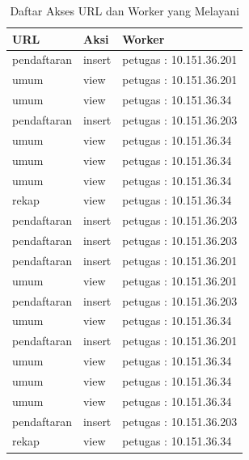 \documentclass{ta-its}
\begin{document}
					\begin{longtable}{|p{}|p{}|p{}|} %
						
						\caption{Daftar Akses URL dan Worker yang Melayani} \label{tabelBagiBeban} \\
						\hline
						\textbf{URL} & \textbf{Aksi} & \textbf{Worker} \\ \hline
						
						\endhead
						\endfoot
						\endlastfoot
						
						pendaftaran & insert & petugas :  10.151.36.201 \\ \hline
						umum & view	& petugas :  10.151.36.201 \\ \hline
						umum & view & petugas :  10.151.36.34 \\ \hline
						pendaftaran & insert & petugas :  10.151.36.203 \\ \hline
						umum & view & petugas :  10.151.36.34 \\ \hline
						umum & view & petugas :  10.151.36.34 \\ \hline
						umum & view & petugas :  10.151.36.34 \\ \hline
						rekap & view & petugas :  10.151.36.34 \\ \hline
						pendaftaran & insert & petugas :  10.151.36.203 \\ \hline
						pendaftaran & insert & petugas :  10.151.36.203 \\ \hline
						pendaftaran	& insert & petugas :  10.151.36.201 \\ \hline
						umum & view & petugas :  10.151.36.201 \\ \hline
						pendaftaran & insert & petugas :  10.151.36.203 \\ \hline
						umum & view & petugas :  10.151.36.34 \\ \hline
						pendaftaran & insert & petugas :  10.151.36.201 \\ \hline
						umum & view & petugas :  10.151.36.34 \\ \hline
						umum & view & petugas :  10.151.36.34 \\ \hline
						umum & view & petugas :  10.151.36.34 \\ \hline
						pendaftaran & insert & petugas :  10.151.36.203 \\ \hline
						rekap & view & petugas :  10.151.36.34 \\ \hline

\end{longtable}
\end{document}
